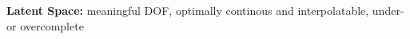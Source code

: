 \textbf{Latent Space:} meaningful DOF, optimally continous and interpolatable, under- or overcomplete\\

